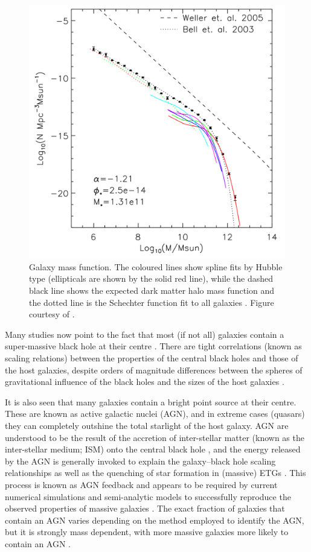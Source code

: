 	\begin{figure}
		\centering
		\includegraphics[width=.6\textwidth]{introduction/agnFeedback.png}
		\caption[Galaxy mass function]{Galaxy mass function. The coloured lines show spline fits by Hubble type (ellipticals are shown by the solid red line), while the dashed black line shows the expected dark matter halo mass function \citep{Weller2005} and the dotted line is the Schechter function fit to all galaxies \citep{Bell2003}. Figure courtesy of \citet{Read2005}.}
		\label{fig:massSuppression}
	\end{figure}


	Many studies now point to the fact that most (if not all) galaxies contain a super-massive black hole at their centre \citep[e.g.][]{Kormendy2013a}. There are tight correlations (known as scaling relations) between the properties of the central black holes and those of the host galaxies, despite orders of magnitude differences between the spheres of gravitational influence of the black holes and the sizes of the host galaxies \citep[e.g.][]{Gudehus1973, Faber1976, Ferrarese2000, Gebhardt2000}. 

	It is also seen that many galaxies contain a bright point source at their centre. These are known as active galactic nuclei (AGN), and in extreme cases (quasars) they can completely outshine the total starlight of the host galaxy. AGN are understood to be the result of the accretion of  inter-stellar matter (known as the inter-stellar medium; ISM) onto the central black hole \citep[e.g.][]{Lynden-Bell1969}, and the energy released by the AGN is generally invoked to explain the galaxy--black hole scaling relationships \citep[e.g.][]{Raimundo2010} as well as the quenching of star formation in (massive) ETGs \citep[e.g.][]{Croton2006, Somerville2008}. This process is known as AGN feedback and appears to be required by current numerical simulations and semi-analytic models to successfully reproduce the observed properties of massive galaxies \citep[e.g.][]{Kauffmann2000, Granato2004, DiMatteo2005, Springel2005, Bower2006, Croton2006, Hopkins2006, Ciotti2010, Scannapieco2012}. The exact fraction of galaxies that contain an AGN varies depending on the method employed to identify the AGN, but it is strongly mass dependent, with more massive galaxies more likely to contain an AGN \citep[e.g.][]{Kauffmann2003a}. 

